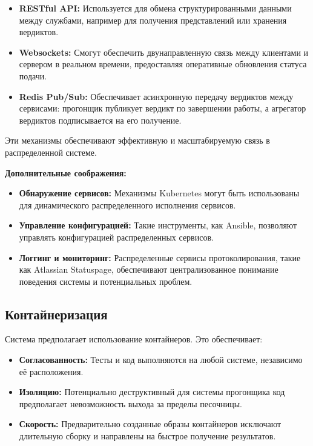 \begin{itemize}
    \itemsep 0em
    \item \textbf{RESTful API:} \noindent Используется для обмена структурированными данными между службами, например для получения представлений или хранения вердиктов.
    \item \textbf{Websockets:} \noindent Смогут обеспечить двунаправленную связь между клиентами и сервером в реальном времени, предоставляя оперативные обновления статуса подачи.
    \item \textbf{Redis Pub/Sub:} \noindent Обеспечивает асинхронную передачу вердиктов между сервисами: прогонщик публикует вердикт по завершении работы, а агрегатор вердиктов подписывается на его получение.
\end{itemize}
Эти механизмы обеспечивают эффективную и масштабируемую связь в распределенной системе.

\noindent
\textbf{Дополнительные соображения:}
\begin{itemize}
    \itemsep 0em
    \item \textbf{Обнаружение сервисов:} \noindent Механизмы Kubernetes могут быть использованы для динамического распределенного исполнения сервисов.
    \item \textbf{Управление конфигурацией:} \noindent Такие инструменты, как Ansible, позволяют управлять конфигурацией распределенных сервисов.
    \item \textbf{Логгинг и мониторинг:} \noindent Распределенные сервисы протоколирования, такие как Atlassian Statuspage, обеспечивают централизованное понимание поведения системы и потенциальных проблем.
\end{itemize}

\subsection{Контайнеризация}
Система предполагает использование контайнеров. Это обеспечивает:
\begin{itemize}
    \itemsep 0em
    \item \textbf{Согласованность:} \noindent Тесты и код выполняются на любой системе, независимо её расположения.
    \item \textbf{Изоляцию:} \noindent Потенциально деструктивный для системы прогонщика код предполагает невозможность выхода за пределы песочницы. 
    \item \textbf{Скорость:} \noindent Предварительно созданные образы контайнеров исключают длительную сборку и направлены на быстрое получение результатов.
\end{itemize}

